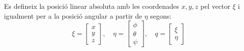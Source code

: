 \documentclass[twoside]{article}
\begin{document}
Es defineix la posició linear absoluta amb les coordenades $x,y,z$ pel vector $\xi$ i igualment per a la posició angular a partir de $\eta$ segons:
\begin{equation}
\xi=\left[ \begin{array}{ccc}
x\\
y\\
z \end{array} \right] ,\quad \eta=\left[ \begin{array}{ccc}
\phi\\
\theta\\
\psi \end{array} \right] , \quad q=\left[\begin{array}{c}
\xi\\
\eta \end{array} \right] 
\end{equation}
\end{document}

